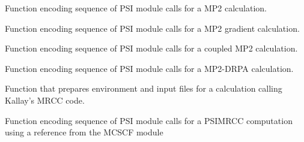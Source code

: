 \documentclass[letterpaper,10pt,english]{sphinxmanual}
\begin{document}

\begin{fulllineitems}
\label{index:proc.run_mp2}
Function encoding sequence of PSI module calls for
a MP2 calculation.

\end{fulllineitems}


\begin{fulllineitems}
\label{index:proc.run_mp2_gradient}
Function encoding sequence of PSI module calls for
a MP2 gradient calculation.

\end{fulllineitems}


\begin{fulllineitems}
\label{index:proc.run_mp2c}
Function encoding sequence of PSI module calls for
a coupled MP2 calculation.

\end{fulllineitems}


\begin{fulllineitems}
\label{index:proc.run_mp2drpa}
Function encoding sequence of PSI module calls for
a MP2-DRPA calculation.

\end{fulllineitems}


\begin{fulllineitems}
\label{index:proc.run_mrcc}
Function that prepares environment and input files
for a calculation calling Kallay's MRCC code.

\end{fulllineitems}


\begin{fulllineitems}
\label{index:proc.run_psimrcc}
Function encoding sequence of PSI module calls for a PSIMRCC computation
using a reference from the MCSCF module

\end{fulllineitems}
\end{document}
